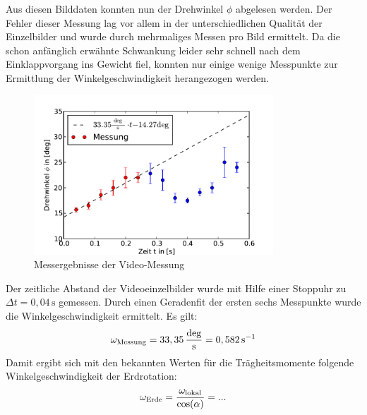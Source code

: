 \documentclass[11pt]{scrartcl}
\newcommand{\unit}[1]{\ensuremath{\,\mathrm{#1}}} %
\newcommand{\ltext}[1]{\ensuremath{_{\textnormal{#1}}}}
\begin{document}
Aus diesen Bilddaten konnten nun der Drehwinkel $\phi$ abgelesen werden. Der Fehler dieser Messung lag vor allem in der unterschiedlichen Qualität der Einzelbilder und wurde durch mehrmaliges Messen pro Bild ermittelt.
Da die schon anfänglich erwähnte Schwankung leider sehr schnell nach dem Einklappvorgang ins Gewicht fiel, konnten nur einige wenige Messpunkte zur Ermittlung der Winkelgeschwindigkeit herangezogen werden.
\begin{figure}[h]
\begin{center}
\includegraphics[width=0.8\textwidth]{messung_Video.pdf}
\end{center}
\vspace{-1.5\baselineskip}
\caption{Messergebnisse der Video-Messung}
\label{messung_Video}
\end{figure}
Der zeitliche Abstand der Videoeinzelbilder wurde mit Hilfe einer Stoppuhr zu $\Delta t = 0,04\unit{s}$ gemessen.
Durch einen Geradenfit der ersten sechs Messpunkte wurde die Winkelgeschwindigkeit ermittelt. Es gilt:
\begin{equation}
\omega\ltext{Messung} = 33,35 \unit{\frac{deg}{s}} = 0,582 \unit{s^{-1}}
\end{equation}
Damit ergibt sich mit den bekannten Werten für die Trägheitsmomente folgende Winkelgeschwindigkeit der Erdrotation:
\begin{equation}
\omega\ltext{Erde} = \frac{\omega\ltext{lokal}}{\cos(\alpha)} = ...
\end{equation}



\FloatBarrier
\end{document}
